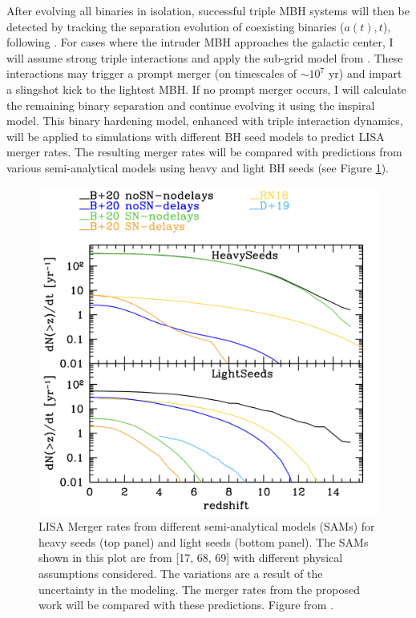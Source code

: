 \documentclass[11pt, letterpaper]{article}
\begin{document}
After evolving all binaries in isolation, successful triple MBH systems will then be detected by tracking the separation evolution of coexisting binaries ($a(t),t$), following \cite{sayeb_mbh_2023}. For cases where the intruder MBH approaches the galactic center, I will assume strong triple interactions and apply the sub-grid model from \cite{bonetti_post-newtonian_2018,bonetti_post-newtonian_2018-1}. These interactions may trigger a prompt merger (on timescales of $\sim 10^7$ yr) and impart a slingshot kick to the lightest MBH. If no prompt merger occurs, I will calculate the remaining binary separation \cite{volonteri_assembly_2003} and continue evolving it using the inspiral model. This binary hardening model, enhanced with triple interaction dynamics, will be applied to simulations with different BH seed models to predict LISA merger rates. The resulting merger rates will be compared with predictions from various semi-analytical models using heavy and light BH seeds (see Figure \ref{fig:SAM-merger-rates}).

\begin{figure}[!htb]
    \centering
    \includegraphics[width=0.7\linewidth]{fig/SAM_merger_rates_comparison.png}
    \caption{LISA Merger rates from different semi-analytical
models (SAMs) for heavy seeds (top panel) and light seeds
(bottom panel). The SAMs shown in this plot are from
[17, 68, 69] with different physical assumptions considered. The variations are a result of the uncertainty in the
modeling. The merger rates from the proposed work will
be compared with these predictions. Figure from \cite{Amaro_Seoane_2023}.}
    \label{fig:SAM-merger-rates}
\end{figure}
\end{document}
